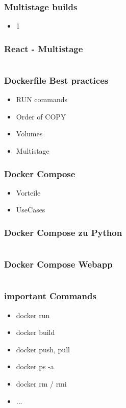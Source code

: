 \documentclass[22pt]{beamer}
\begin{document}
\begin{frame}[t]
    \frametitle{Multistage builds}
    \begin{itemize}
        \item 1
    \end{itemize} 
\end{frame}

\begin{frame}[fragile]
    \frametitle{React - Multistage}
    \inputminted[fontsize=\footnotesize, frame=lines]{dockerfile}{../examples/Dockerfile.cmd}
\end{frame}

\begin{frame}[t]
    \frametitle{Dockerfile Best practices}
    \begin{itemize}
        \item RUN commands
        \item Order of COPY
        \item Volumes
        \item Multistage
    \end{itemize} 
\end{frame}

\begin{frame}[t]
    \frametitle{Docker Compose}
    \begin{itemize}
        \item Vorteile
        \item UseCases
    \end{itemize} 
\end{frame}

\begin{frame}[fragile]
    \frametitle{Docker Compose zu Python}
    \inputminted[fontsize=\footnotesize, frame=lines]{dockerfile}{../examples/Dockerfile.cmd}
\end{frame}

\begin{frame}[fragile]
    \frametitle{Docker Compose Webapp}
    \inputminted[fontsize=\footnotesize, frame=lines]{dockerfile}{../examples/Dockerfile.cmd}
\end{frame}

\begin{frame}[t]
    \frametitle{important Commands}
    \begin{itemize}
        \item docker run
        \item docker build
        \item docker push, pull
        \item docker ps -a
        \item docker rm / rmi
        \item ...
    \end{itemize} 
\end{frame}
\end{document}
